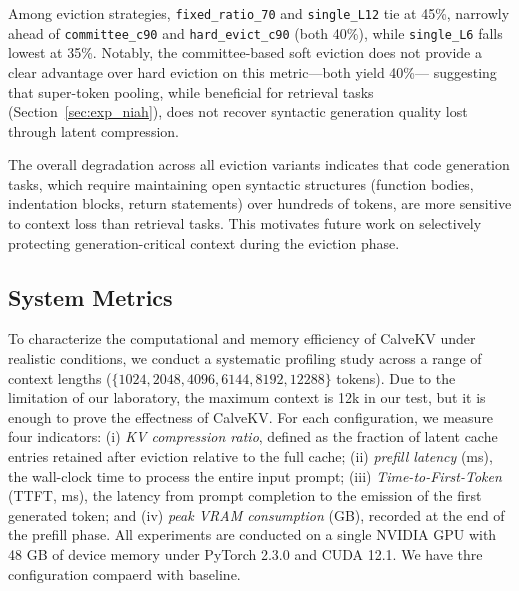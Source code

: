\documentclass[letterpaper]{article} %
\begin{document}
Among eviction strategies, \texttt{fixed\_ratio\_70} and \texttt{single\_L12} tie at 45\%,
narrowly ahead of \texttt{committee\_c90} and \texttt{hard\_evict\_c90} (both 40\%), while
\texttt{single\_L6} falls lowest at 35\%. Notably, the committee-based soft eviction does
not provide a clear advantage over hard eviction on this metric---both yield 40\%---
suggesting that super-token pooling, while beneficial for retrieval tasks (Section~\ref{sec:exp_niah}),
does not recover syntactic generation quality lost through latent compression.

The overall degradation across all eviction variants indicates that code generation tasks,
which require maintaining open syntactic structures (function bodies, indentation blocks,
return statements) over hundreds of tokens, are more sensitive to context loss than
retrieval tasks. This motivates future work on selectively protecting generation-critical
context during the eviction phase.




\subsection{System Metrics}
\label{sec:exp_system}

To characterize the computational and memory efficiency of CalveKV under realistic
conditions, we conduct a systematic profiling study across a range of context lengths
($\{1024, 2048, 4096, 6144, 8192, 12288\}$ tokens). Due to the limitation of our laboratory, 
the maximum context is 12k in our test, but it is enough to prove the effectness of CalveKV.
For each configuration, we measure
four indicators: (i) \emph{KV compression ratio}, defined as the fraction of latent cache
entries retained after eviction relative to the full cache; (ii) \emph{prefill latency}
(ms), the wall-clock time to process the entire input prompt; (iii)
\emph{Time-to-First-Token} (TTFT, ms), the latency from prompt completion to the emission
of the first generated token; and (iv) \emph{peak VRAM consumption} (GB), recorded at the
end of the prefill phase. All experiments are conducted on a single NVIDIA GPU with 48 GB
of device memory under PyTorch 2.3.0 and CUDA 12.1. We have thre configuration compaerd with
baseline.
\end{document}
